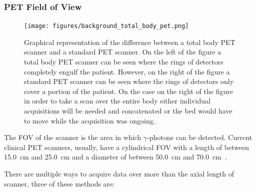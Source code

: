             \subsubsection{PET Field of View} \label{sec:pet_field_of_view}
                \begin{figure}
                    \centering
                    
                    \texttt{[image: figures/background\_total\_body\_pet.png]}
                    
                    \captionsetup{singlelinecheck=false, justification=raggedright}
                    \caption{Graphical representation of the difference between a total body \gls{PET} scanner and a standard \gls{PET} scanner. On the left of the figure a total body \gls{PET} scanner can be seen where the rings of detectors completely engulf the patient. However, on the right of the figure a standard \gls{PET} scanner can be seen where the rings of detectors only cover a portion of the patient. On the case on the right of the figure in order to take a scan over the entire body either individual acquisitions will be needed and concatenated or the bed would have to move while the acquisition was ongoing.} \label{fig:pet_fov_total_body_pet}
                \end{figure}
                
                The \gls{FOV} of the scanner is the area in which $\gamma$-photons can be detected. Current clinical \gls{PET} scanners, usually, have a cylindrical \gls{FOV} with a length of between \SI{15.0}{\centi\metre} and \SI{25.0}{\centi\metre} and a diameter of between \SI{50.0}{\centi\metre} and \SI{70.0}{\centi\metre}~\parencite{Pan2019}.
                
                There are multiple ways to acquire data over more than the axial length of scanner, three of these methods are:
                
